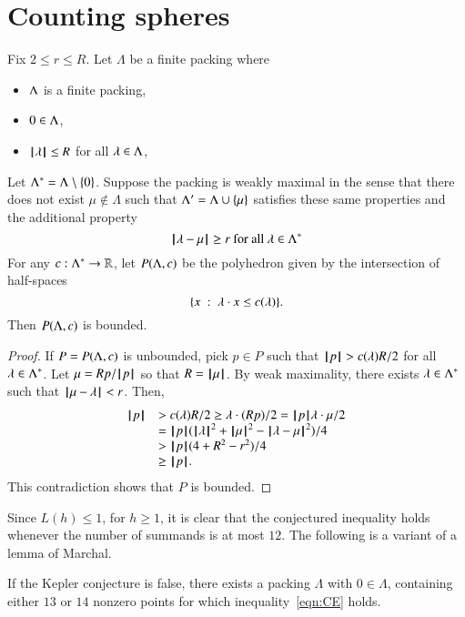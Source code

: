 \section{Counting spheres}

\begin{lemma}\label{lemma:poly-bounded} 
Fix $2\le r\le R$.
Let $\Lambda$ be a finite packing where 
\begin{itemize}
  \item $\Lambda$ is a finite packing, 
  \item $0\in\Lambda$,
  \item ${{\hskip0.1em|\hskip-0.15em|\hskip0.1em}\lambda{\hskip0.1em|\hskip-0.15em|\hskip0.1em}}\le R$ for all $\lambda\in\Lambda$,
\end{itemize}
Let $\Lambda^*=\Lambda\setminus\{0\}$.
Suppose the packing is weakly maximal in the sense that there does not exist $\mu\not\in\Lambda$ such that $\Lambda'=\Lambda\cup\{\mu\}$ satisfies these same properties
and the additional property
 $$
{\hskip0.1em|\hskip-0.15em|\hskip0.1em}\lambda - \mu{\hskip0.1em|\hskip-0.15em|\hskip0.1em}\ge r \text{ for all } \lambda\in\Lambda^*
 $$
For any $c:\Lambda^*\to\mathbb{R}$, let $P(\Lambda,c)$ be the
polyhedron given by the intersection of half-spaces
$$
\{x \ :\  \lambda\cdot x \le c(\lambda)\}.
$$
Then $P(\Lambda,c)$ is bounded.
\end{lemma}

\begin{proof}  If $P=P(\Lambda,c)$ is unbounded, pick $p\in P$ such that
${{\hskip0.1em|\hskip-0.15em|\hskip0.1em}p{\hskip0.1em|\hskip-0.15em|\hskip0.1em}} > c(\lambda) R/2$ for all $\lambda\in\Lambda^*$.  Let $\mu =  R p/{{\hskip0.1em|\hskip-0.15em|\hskip0.1em}p{\hskip0.1em|\hskip-0.15em|\hskip0.1em}}$ so that $R={{\hskip0.1em|\hskip-0.15em|\hskip0.1em}\mu{\hskip0.1em|\hskip-0.15em|\hskip0.1em}}$.  By weak maximality, there exists $\lambda\in\Lambda^*$ such that ${\hskip0.1em|\hskip-0.15em|\hskip0.1em}\mu - \lambda{\hskip0.1em|\hskip-0.15em|\hskip0.1em}<r$.    Then,
$$
\begin{array}{lll}
\normo{p} &> c(\lam) R/2 \ge \lam\cdot (R p)/2 = \normo{p} \lam\cdot \mu /2\\
  &= \normo{p} (\normo{\lam}^2 + \normo{\mu}^2 - \norm{\lam}{\mu}^2)/4\\
  &> \normo{p}(4+R^2-r^2)/4\\
  &\ge \normo{p}.
\end{array}
$$
This contradiction shows that $P$ is bounded.
\end{proof}




Since $L(h)\le 1$, for $h\ge1$, it is clear that the conjectured inequality holds whenever the number of summands is at most $12$. The following is a variant of a lemma of Marchal.


\begin{lemma}\label{lemma:13-14}  
If the Kepler conjecture is false, there exists a packing $\Lambda$ with $0\in\Lambda$, containing either $13$ or $14$ nonzero points for which inequality~\ref{eqn:CE} holds.
\end{lemma}


